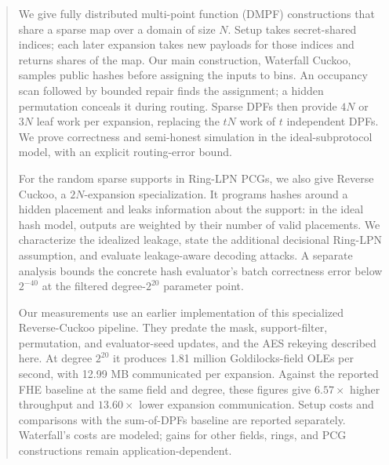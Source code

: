 \begin{abstract}
We give fully distributed multi-point function (DMPF) constructions that
share a sparse map over a domain of size $N$.
Setup takes secret-shared indices; each later expansion takes new payloads
for those indices and returns shares of the map.
Our main construction, Waterfall Cuckoo, samples public hashes before
assigning the inputs to bins. An occupancy scan followed by bounded repair
finds the assignment; a hidden permutation conceals it during routing.
Sparse DPFs then provide $4N$ or $3N$ leaf work per expansion, replacing the
$tN$ work of $t$ independent DPFs.
We prove correctness and semi-honest simulation in the ideal-subprotocol
model, with an explicit routing-error bound.

For the random sparse supports in Ring-LPN PCGs, we also give Reverse Cuckoo,
a $2N$-expansion specialization. It programs hashes around a hidden placement
and leaks information about the support: in the ideal hash model, outputs
are weighted by their number of valid placements.
We characterize the idealized leakage, state the additional decisional
Ring-LPN assumption, and evaluate leakage-aware decoding attacks.
A separate analysis bounds the concrete hash evaluator's batch correctness
error below $2^{-40}$ at the filtered degree-$2^{20}$ parameter point.

Our measurements use an earlier implementation of this specialized
Reverse-Cuckoo pipeline. They predate the mask, support-filter, permutation,
and evaluator-seed updates, and the AES rekeying described here.
At degree $2^{20}$ it produces 1.81 million Goldilocks-field OLEs per second,
with 12.99 MB communicated per expansion.
Against the reported FHE baseline at the same field and degree, these figures
give $6.57\times$ higher throughput and $13.60\times$ lower expansion
communication. Setup costs and comparisons with the sum-of-DPFs baseline
are reported separately.
Waterfall's costs are modeled; gains for other fields, rings, and PCG
constructions remain application-dependent.
\end{abstract}
